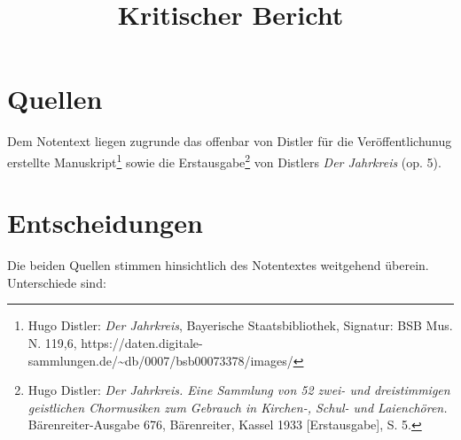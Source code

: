 \documentclass{article}
\title{Kritischer Bericht}
\begin{document}
\maketitle

\begin{multicols}{2}


\section{Quellen}

Dem Notentext liegen zugrunde das offenbar von Distler für die
Veröffentlichunug erstellte Manuskript\footnote{Hugo Distler: \emph{Der
  Jahrkreis}, Bayerische Staatsbibliothek, Signatur: BSB Mus. N. 119,6,
  https://daten.digitale-sammlungen.de/\textasciitilde db/0007/bsb00073378/images/}
sowie die Erstausgabe\footnote{Hugo Distler: \emph{Der Jahrkreis. Eine
  Sammlung von 52 zwei- und dreistimmigen geistlichen Chormusiken zum
  Gebrauch in Kirchen-, Schul- und Laienchören.} Bärenreiter-Ausgabe
  676, Bärenreiter, Kassel 1933 {[}Erstausgabe{]}, S. 5.} von Distlers
\emph{Der Jahrkreis} (op. 5).

\section{Entscheidungen}

Die beiden Quellen stimmen hinsichtlich des Notentextes weitgehend
überein. Unterschiede sind:


\end{multicols}
\end{document}
